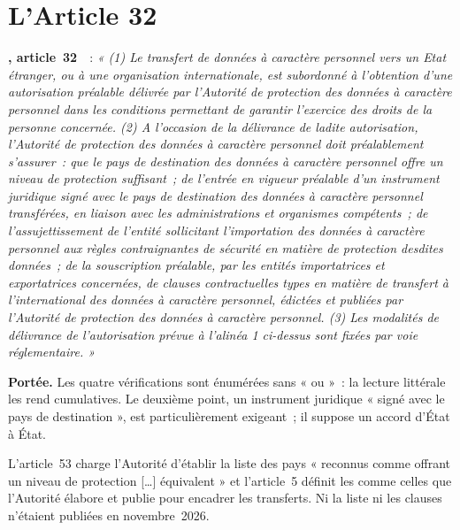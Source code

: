\section{L'Article 32}
\label{sec:c11-article32}

\begin{boxjuris}
\textbf{, article~32}~\cite{loi2024017}~:
\textit{« (1) Le transfert de données à caractère personnel vers un Etat
étranger, ou à une organisation internationale, est subordonné à
l'obtention d'une autorisation préalable délivrée par l'Autorité de
protection des données à caractère personnel dans les conditions
permettant de garantir l'exercice des droits de la personne concernée.
(2) A l'occasion de la délivrance de ladite autorisation, l'Autorité de
protection des données à caractère personnel doit préalablement
s'assurer~: que le pays de destination des données à caractère personnel
offre un niveau de protection suffisant~; de l'entrée en vigueur préalable
d'un instrument juridique signé avec le pays de destination des données à
caractère personnel transférées, en liaison avec les administrations et
organismes compétents~; de l'assujettissement de l'entité sollicitant
l'importation des données à caractère personnel aux règles contraignantes
de sécurité en matière de protection desdites données~; de la souscription
préalable, par les entités importatrices et exportatrices concernées, de
clauses contractuelles types en matière de transfert à l'international des
données à caractère personnel, édictées et publiées par l'Autorité de
protection des données à caractère personnel. (3) Les modalités de
délivrance de l'autorisation prévue à l'alinéa 1 ci-dessus sont fixées par
voie réglementaire. »}

\smallskip
\textbf{Portée.} Les quatre vérifications sont énumérées sans « ou »~: la
lecture littérale les rend cumulatives. Le deuxième point, un instrument
juridique « signé avec le pays de destination », est particulièrement
exigeant~; il suppose un accord d'État à État.
\end{boxjuris}

L'article~53 charge l'Autorité d'établir la liste des pays « reconnus comme
offrant un niveau de protection [\ldots] équivalent » et l'article~5
définit les  comme celles que
l'Autorité élabore et publie pour encadrer les transferts. Ni la liste ni
les clauses n'étaient publiées en novembre~2026.

